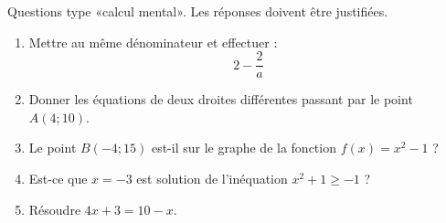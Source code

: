 
\begin{exercice}[\ldots/4]\label{exosmath-0693}

    Questions type «calcul mental». Les réponses doivent être justifiées.
    \begin{multicols}{2}
        \begin{enumerate}
            \item
                Mettre au même dénominateur et effectuer :
                \begin{equation}
                    2-\frac{ 2 }{ a }
                \end{equation}
            \item
                Donner les équations de deux droites différentes passant par le point \( A(4;10)\).
            \item
                Le point \( B(-4;15)\) est-il sur le graphe de la fonction \( f(x)=x^2-1\) ?
            \item
                Est-ce que \( x=-3\) est solution de l'inéquation \( x^2+1\geq -1\) ?
            \item
                Résoudre $4x+3=10-x$.
        \end{enumerate}
    \end{multicols}

\end{exercice}
